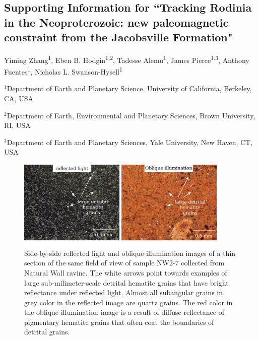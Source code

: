 \documentclass[11pt,letterpaper]{article}
\begin{document}
\renewcommand{\thefigure}{S\arabic{figure}}
\renewcommand{\thetable}{S\arabic{table}}
\subsection*{Supporting Information for ``Tracking Rodinia in the Neoproterozoic: new paleomagnetic constraint from the Jacobsville Formation"}
Yiming Zhang\textsuperscript{1}, Eben B. Hodgin\textsuperscript{1,2}, Tadesse Alemu\textsuperscript{1}, James Pierce\textsuperscript{1,3}, Anthony Fuentes\textsuperscript{1}, Nicholas L. Swanson-Hysell\textsuperscript{1}

{\small $^{1}$Department of Earth and Planetary Science, University of California, Berkeley, CA, USA

$^{2}$Department of Earth, Environmental and Planetary Sciences, Brown University, RI, USA

$^{3}$Department of Earth and Planetary Sciences, Yale University, New Haven, CT, USA}

\listoffigures
\listoftables


\begin{figure}[h!]
\centering
\includegraphics[width=0.9\textwidth]{Manuscript/SI_petrography.png}
\caption{Side-by-side reflected light and oblique illumination images of a thin section of the same field of view of sample NW2-7 collected from Natural Wall ravine. The white arrows point towards examples of large sub-milimeter-scale detrital hematite grains that have bright reflectance under reflected light. Almost all subangular grains in grey color in the reflected image are quartz grains. The red color in the oblique illumination image is a result of diffuse reflectance of pigmentary hematite grains that often coat the boundaries of detrital grains. }
\label{fig:SI_orthogonal}
\end{figure}
\end{document}

